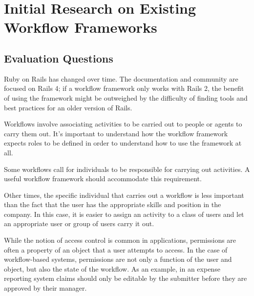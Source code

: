 \documentclass[document.tex]{subfiles}
\begin{document}
\chapter {Initial Research on Existing Workflow Frameworks}


\section {Evaluation Questions}
\label {sec:evaluation-questions}



Ruby on Rails has changed over time. The documentation and community are focused on Rails 4; if a workflow framework only works with Rails 2, the benefit of using the framework might be outweighed by the difficulty of finding tools and best practices for an older version of Rails.


Workflows involve associating activities to be carried out to people or agents to carry them out. It's important to understand how the workflow framework expects roles to be defined in order to understand how to use the framework at all.


Some workflows call for individuals to be responsible for carrying out activities. A useful workflow framework should accommodate this requirement.


Other times, the specific individual that carries out a workflow is less important than the fact that the user has the appropriate skills and position in the company. In this case, it is easier to assign an activity to a class of users and let an appropriate user or group of users carry it out.

 
While the notion of access control is common in applications, permissions are often a property of an object that a user attempts to access. In the case of workflow-based systems, permissions are not only a function of the user and object, but also the state of the workflow. As an example, in an expense reporting system claims should only be editable by the submitter before they are approved by their manager.
\end{document}
